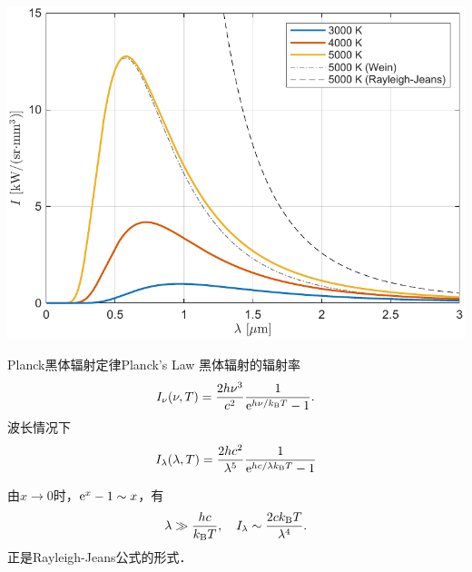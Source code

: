\begin{center}
	\includegraphics[width=0.8\linewidth]{figures/blackbody.pdf}
	\label{fig:blackbody radiation}
\end{center}

\begin{theorem}{Planck黑体辐射定律}{Planck's Law}
	黑体辐射的辐射率
	\begin{align}
		I_\nu(\nu,T)=\frac{2h\nu^3}{c^2}\frac{1}{\mathop{}\!\mathrm{e}^{h\nu/k_{\mathrm B} T}-1}.
	\end{align}
	波长情况下
	\begin{align}
		I_\lambda(\lambda,T)=\frac{2hc^2}{\lambda^5}\frac{1}{\mathop{}\!\mathrm{e}^{hc/\lambda k_{\mathrm B} T}-1}
	\end{align}
\end{theorem}
由$x\to0$时，$\mathop{}\!\mathrm{e}^ x-1\sim x$，有
\[
	\lambda\gg\frac{hc}{k_{\mathrm B} T},\quad I_\lambda\sim\frac{2ck_{\mathrm B} T}{\lambda^4}.
\]
正是Rayleigh-Jeans公式的形式．

